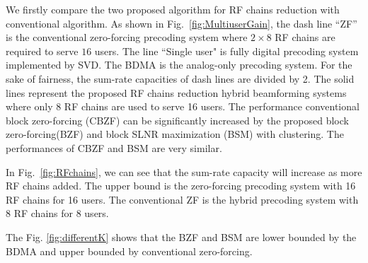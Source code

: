 \documentclass[conference]{IEEEtran}
\begin{document}
{%


We firstly compare the two proposed algorithm for RF chains reduction with conventional algorithm. As shown in Fig.~\ref{fig:MultiuserGain}, the dash line ``ZF'' is the conventional zero-forcing precoding system where $2\times 8$ RF chains are required to serve $16$ users. The line ``Single user" is fully digital precoding system implemented by SVD. The BDMA is the analog-only precoding system. For the sake of fairness, the sum-rate capacities of dash lines are divided by 2. The solid lines represent the proposed RF chains reduction hybrid beamforming systems where only 8 RF chains are used to serve 16 users. The performance conventional block zero-forcing (CBZF) can be significantly increased by the proposed block zero-forcing(BZF) and block SLNR maximization (BSM) with clustering. The performances of CBZF and BSM are very similar.


In Fig.~\ref{fig:RFchains}, we can see that the sum-rate capacity will increase as more RF chains added. The upper bound is the zero-forcing precoding system with 16 RF chains for 16 users. The conventional ZF is the hybrid precoding system with 8 RF chains for 8 users.



The Fig. \ref{fig:differentK} shows that the BZF and BSM are lower bounded by the BDMA and upper bounded by conventional zero-forcing.

}
\end{document}
